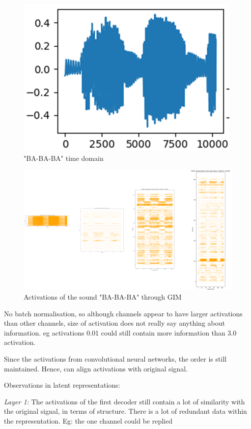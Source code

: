 \begin{appendices}
	
	
	\begin{figure}[h]
		\centering
		\includegraphics[width=0.7\linewidth]{screenshot007}
		\caption{"BA-BA-BA" time domain}
		\label{fig:screenshot007}
	\end{figure}
	
	\begin{figure}[h]
		\centering
		\includegraphics[width=0.7\linewidth]{screenshot006}
		\caption{Activations of the sound "BA-BA-BA" through GIM}
		\label{fig:gim latent activations}
	\end{figure}
	
	No batch normalisation, so although channels appear to have larger activations than other channels, size of activation does not really say anything about information. eg activations 0.01 could still contain more information than 3.0 activation.
	
	Since the activations from convolutional neural networks, the order is still maintained. Hence, can align activations with original signal.
	
	Observations in latent representations:
	
	\textit{Layer 1:}
	The activations of the first decoder still contain a lot of similarity with the original signal, in terms of structure. There is a lot of redundant data within the representation. Eg: the one channel could be replied 
	

\end{appendices}
